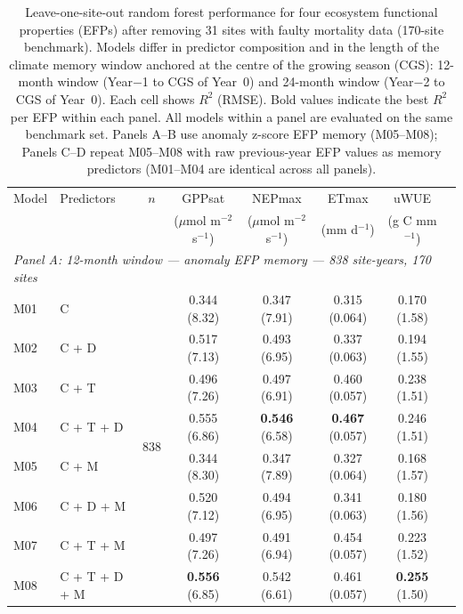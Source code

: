 \begin{table}[htbp]
\centering
\caption{Leave-one-site-out random forest performance for four ecosystem
functional properties (EFPs) after removing 31 sites with faulty mortality data
(170-site benchmark). Models differ in predictor composition and in the
length of the climate memory window anchored at the centre of the growing season
(CGS): 12-month window (Year$-$1 to CGS of Year~0) and 24-month window
(Year$-$2 to CGS of Year~0). Each cell shows $R^2$ (RMSE). Bold values indicate
the best $R^2$ per EFP within each panel. All models within a panel are evaluated
on the same benchmark set. Panels A--B use anomaly z-score EFP memory (M05--M08);
Panels C--D repeat M05--M08 with raw previous-year EFP values as memory
predictors (M01--M04 are identical across all panels).}
\label{tab:RF_LOSO_fixed}
\footnotesize
\begin{tabular}{llcccccc}
\toprule
Model & Predictors & $n$ &
  GPPsat & NEPmax & ETmax & uWUE \\
  & & &
  ($\mu$mol m$^{-2}$ s$^{-1}$) &
  ($\mu$mol m$^{-2}$ s$^{-1}$) &
  (mm d$^{-1}$) &
  (g C mm$^{-1}$) \\
\midrule
\multicolumn{7}{l}{\textit{Panel A: 12-month window --- anomaly EFP memory --- 838 site-years, 170 sites}} \\
\midrule
M01 & C                   & \multirow{8}{*}{838} & 0.344 (8.32) & 0.347 (7.91) & 0.315 (0.064) & 0.170 (1.58) \\
M02 & C + D               &                      & 0.517 (7.13) & 0.493 (6.95) & 0.337 (0.063) & 0.194 (1.55) \\
M03 & C + T               &                      & 0.496 (7.26) & 0.497 (6.91) & 0.460 (0.057) & 0.238 (1.51) \\
M04 & C + T + D           &                      & 0.555 (6.86) & \textbf{0.546} (6.58) & \textbf{0.467} (0.057) & 0.246 (1.51) \\
M05 & C + M               &                      & 0.344 (8.30) & 0.347 (7.89) & 0.327 (0.064) & 0.168 (1.57) \\
M06 & C + D + M           &                      & 0.520 (7.12) & 0.494 (6.95) & 0.341 (0.063) & 0.180 (1.56) \\
M07 & C + T + M           &                      & 0.497 (7.26) & 0.491 (6.94) & 0.454 (0.057) & 0.223 (1.52) \\
M08 & C + T + D + M       &                      & \textbf{0.556} (6.85) & 0.542 (6.61) & 0.461 (0.057) & \textbf{0.255} (1.50) \\

\end{tabular}
\end{table}
